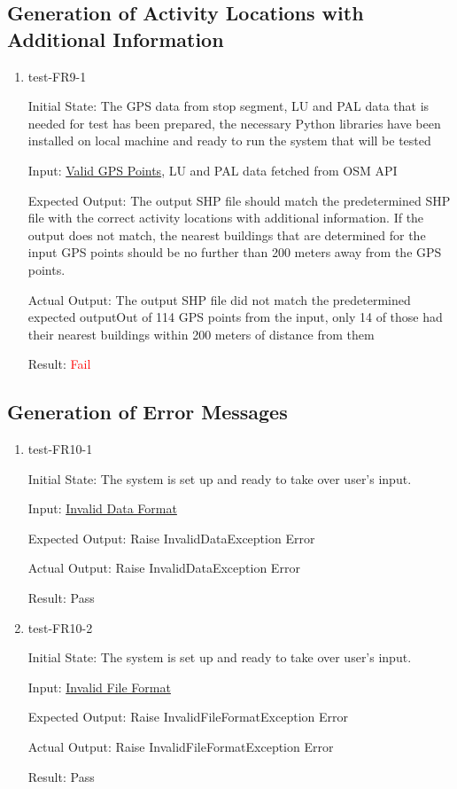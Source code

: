 \documentclass[12pt, titlepage]{article}
\begin{document}
\subsection{Generation of Activity Locations with Additional Information}
\begin{enumerate}
    \item {test-FR9-1}\label{test-FR9-1}
    
    Initial State: The GPS data from stop segment, LU and PAL data that is needed for test has been prepared, the necessary Python libraries have been installed on local machine and ready to run the system that will be tested
    
    Input: \href{https://github.com/paezha/PyERT-BLACK/blob/rev0-test/quarto-example/data/sample-gps/sample-gps-1.csv}{Valid GPS Points}, LU and PAL data fetched from OSM API
    
    Expected Output: The output SHP file should match the predetermined SHP file with the correct activity locations with additional information. If the output does not match, the nearest buildings that are determined for the input GPS points should be no further than 200 meters away from the GPS points.
    
    Actual Output: The output SHP file did not match the predetermined expected outputOut of 114 GPS points from the input, only 14 of those had their nearest buildings within 200 meters of distance from them
    
    Result: \textcolor{red}{Fail}
\end{enumerate}

\subsection{Generation of Error Messages}
\begin{enumerate}
    \item test-FR10-1\label{test-FR10-1}
    
    Initial State: The system is set up and ready to take over user’s input.
    
    Input: \href{https://github.com/paezha/PyERT-BLACK/blob/rev0-test/quarto-example/data/sample-gps/sample-gps-4.csv}{Invalid Data Format}
    
    Expected Output: Raise InvalidDataException Error
    
    Actual Output: Raise InvalidDataException Error
    
    Result: Pass
    \item test-FR10-2\label{test-FR10-2}
    
    Initial State: The system is set up and ready to take over user’s input.
    
    Input: \href{https://github.com/paezha/PyERT-BLACK/blob/rev0-test/quarto-example/data/sample-gps/sample-gps-1.gpx}{Invalid File Format}
    
    Expected Output: Raise InvalidFileFormatException Error
    
    Actual Output: Raise InvalidFileFormatException Error
    
    Result: Pass
\end{enumerate}
\end{document}
